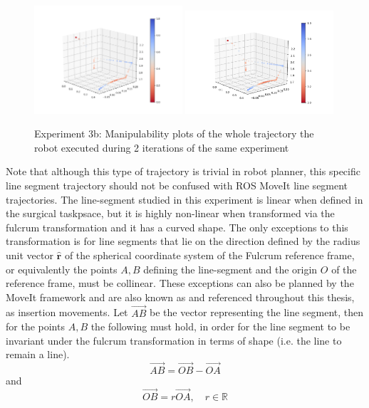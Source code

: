 \begin{center}
\begin{figure}[!htb]
\centering
\includegraphics[width=0.49\textwidth]{images/robot_planner3/robot_planner3b_manip1.png}
\includegraphics[width=0.49\textwidth]{images/robot_planner3/robot_planner3b_manip2.png}
\caption{Experiment 3b: Manipulability plots of the whole trajectory the robot executed during 2 iterations of the same experiment}
\label{robot-planner3b-line-seg-manipulability-plots}
\end{figure}
\end{center}

Note that although this type of trajectory is trivial in robot planner, this specific line segment trajectory should not be confused with ROS MoveIt line segment trajectories. The line-segment studied in this experiment 
is linear when defined in the surgical taskpsace, but it is highly non-linear when transformed via the fulcrum transformation and it has a curved shape. The only exceptions to this transformation is for line segments that 
lie on the direction defined by the radius unit vector $\mathbf{\hat{r}}$ of the spherical coordinate system of the Fulcrum reference frame, or equivalently the points $A,B$ defining the line-segment and the origin $O$ 
of the reference frame, must be collinear. These exceptions can also be planned by the MoveIt framework and are also known 
as and referenced throughout this thesis, as insertion movements. Let $\overrightarrow{AB}$ be the vector representing the line segment, then for the points $A, B$ the following must hold, in order for the line segment to be 
invariant under the fulcrum transformation in terms of shape (i.e. the line to remain a line).
\begin{equation}
\overrightarrow{AB} = \overrightarrow{OB} - \overrightarrow{OA}
\end{equation} 
and
\begin{equation}
\overrightarrow{OB} = r \overrightarrow{OA}, \quad r \in \mathbb{R}
\end{equation}

